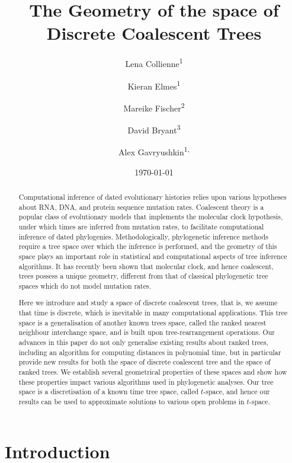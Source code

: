 \documentclass[11pt]{amsart}
\title[Geometry of ranked tree spaces]{The Geometry of the space of Discrete Coalescent Trees}
\date{\today}
\author{Lena Collienne\textsuperscript{1}}
\author{Kieran Elmes\textsuperscript{1}}
\author{Mareike Fischer\textsuperscript{2}}
\author{David Bryant\textsuperscript{3}}
\author{Alex Gavryushkin\textsuperscript{1, \Letter}}
\begin{document}
\begin{abstract}
Computational inference of dated evolutionary histories relies upon various hypotheses about RNA, DNA, and protein sequence mutation rates.
Coalescent theory is a popular class of evolutionary models that implements the molecular clock hypothesis, under which times are inferred from mutation rates, to facilitate computational inference of dated phylogenies.
Methodologically, phylogenetic inference methods require a tree space over which the inference is performed, and the geometry of this space plays an important role in statistical and computational aspects of tree inference algorithms.
It has recently been shown that molecular clock, and hence coalescent, trees possess a unique geometry, different from that of classical phylogenetic tree spaces which do not model mutation rates.

Here we introduce and study a space of discrete coalescent trees, that is, we assume that time is discrete, which is inevitable in many computational applications.
This tree space is a generalisation of another known trees space, called the ranked nearest neighbour interchange space, and is built upon tree-rearrangement operations.
Our advances in this paper do not only generalise existing results about ranked trees, including an algorithm for computing distances in polynomial time, but in particular provide new results for both the space of discrete coalescent tree and the space of ranked trees.
We establish several geometrical properties of these spaces and show how these properties impact various algorithms used in phylogenetic analyses.
Our tree space is a discretisation of a known time tree space, called $t$-space, and hence our results can be used to approximate solutions to various open problems in $t$-space.
\end{abstract}

\maketitle


\section{Introduction}
\end{document}
